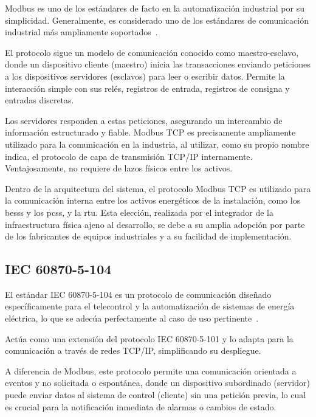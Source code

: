 Modbus es uno de los estándares de facto en la automatización industrial por su simplicidad. Generalmente, es considerado uno de los estándares de comunicación industrial más ampliamente soportados~\cite{swales1999open}.

El protocolo sigue un modelo de comunicación conocido como maestro-esclavo, donde un dispositivo cliente (maestro) inicia las transacciones enviando peticiones a los dispositivos servidores (esclavos) para leer o escribir datos. Permite la interacción simple con sus relés, registros de entrada, registros de consigna y entradas discretas.

Los servidores responden a estas peticiones, asegurando un intercambio de información estructurado y fiable. Modbus TCP es precisamente ampliamente utilizado para la comunicación en la industria, al utilizar, como su propio nombre indica, el protocolo de capa de transmisión TCP/IP internamente. Ventajosamente, no requiere de lazos físicos entre los activos.

Dentro de la arquitectura del sistema, el protocolo Modbus TCP es utilizado para la comunicación interna entre los activos energéticos de la instalación, como los \glspl{bess} y los \glspl{pcs}, y la \gls{rtu}. Esta elección, realizada por el integrador de la infraestructura física ajeno al desarrollo, se debe a su amplia adopción por parte de los fabricantes de equipos industriales y a su facilidad de implementación.

\subsection{IEC 60870{-}5{-}104}%
\label{makereference3.3.2}

El estándar IEC 60870{-}5{-}104 es un protocolo de comunicación diseñado específicamente para el telecontrol y la automatización de sistemas de energía eléctrica, lo que se adecúa perfectamente al caso de uso pertinente~\cite{iec2016telecontrol}.

Actúa como una extensión del protocolo IEC 60870{-}5{-}101 y lo adapta para la comunicación a través de redes TCP/IP, simplificando su despliegue.

A diferencia de Modbus, este protocolo permite una comunicación orientada a eventos y no solicitada o espontánea, donde un dispositivo subordinado (servidor) puede enviar datos al sistema de control (cliente) sin una petición previa, lo cual es crucial para la notificación inmediata de alarmas o cambios de estado.

